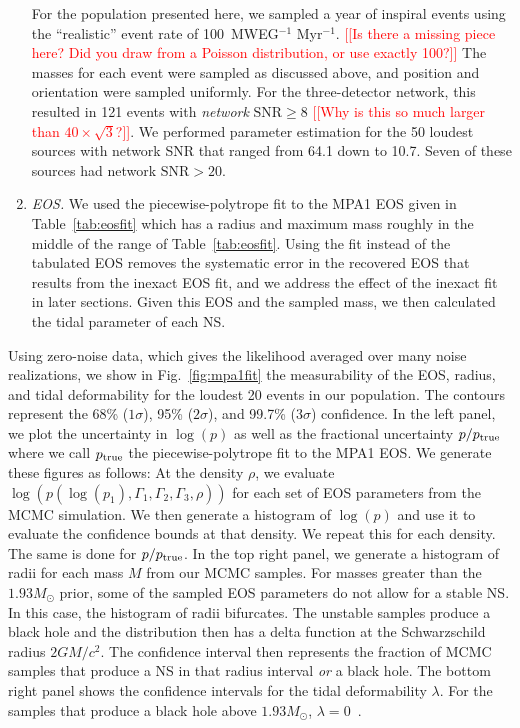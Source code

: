 \documentclass[twocolumn,prd,amssymb,aps,nofootinbib,showpacs,epsf]{revtex4}
\newcommand{\red}{\textcolor{red}}
\begin{document}
\begin{enumerate}
For the population presented here, we sampled a year of inspiral events using the ``realistic'' event rate of 100~MWEG$^{-1}$ Myr$^{-1}$. \red{[[Is there a missing piece here? Did you draw from a Poisson distribution, or use exactly 100?]]} The masses for each event were sampled as discussed above, and position and orientation were sampled uniformly. For the three-detector network, this resulted in 121 events with \textit{network} $\text{SNR} \ge 8$ \red{[[Why is this so much larger than $40\times\sqrt{3}$?]]}. We performed parameter estimation for the 50 loudest sources with network SNR that ranged from 64.1 down to 10.7. Seven of these sources had network $\text{SNR} > 20$.

\item \textit{EOS.} We used the piecewise-polytrope fit to the MPA1 EOS given in Table~\ref{tab:eosfit} which has a radius and maximum mass roughly in the middle of the range of Table~\ref{tab:eosfit}. Using the fit instead of the tabulated EOS removes the systematic error in the recovered EOS that results from the inexact EOS fit, and we address the effect of the inexact fit in later sections. Given this EOS and the sampled mass, we then calculated the tidal parameter of each NS.

\end{enumerate}

Using zero-noise data, which gives the likelihood averaged over many noise realizations, we show in Fig.~\ref{fig:mpa1fit} the measurability of the EOS, radius, and tidal deformability for the loudest 20 events in our population. The contours represent the 68\% ($1\sigma$), 95\% ($2\sigma$), and 99.7\% ($3\sigma$) confidence. In the left panel, we plot the uncertainty in $\log(p)$ as well as the fractional uncertainty $p/p_{\rm true}$ where we call $p_{\rm true}$ the piecewise-polytrope fit to the MPA1 EOS. We generate these figures as follows: At the density $\rho$, we evaluate $\log(p(\log(p_1), \Gamma_1, \Gamma_2, \Gamma_3, \rho))$ for each set of EOS parameters from the MCMC simulation. We then generate a histogram of $\log(p)$ and use it to evaluate the confidence bounds at that density. We repeat this for each density. The same is done for $p/p_{\rm true}$. In the top right panel, we generate a histogram of radii for each mass $M$ from our MCMC samples. For masses greater than the $1.93M_\odot$ prior, some of the sampled EOS parameters do not allow for a stable NS. In this case, the histogram of radii bifurcates. The unstable samples produce a black hole and the distribution then has a delta function at the Schwarzschild radius $2GM/c^2$. The confidence interval then represents the fraction of MCMC samples that produce a NS in that radius interval \textit{or} a black hole. The bottom right panel shows the confidence intervals for the tidal deformability $\lambda$. For the samples that produce a black hole above $1.93M_\odot$, $\lambda=0$~\cite{BinningtonPoisson2009}.
\end{document}
